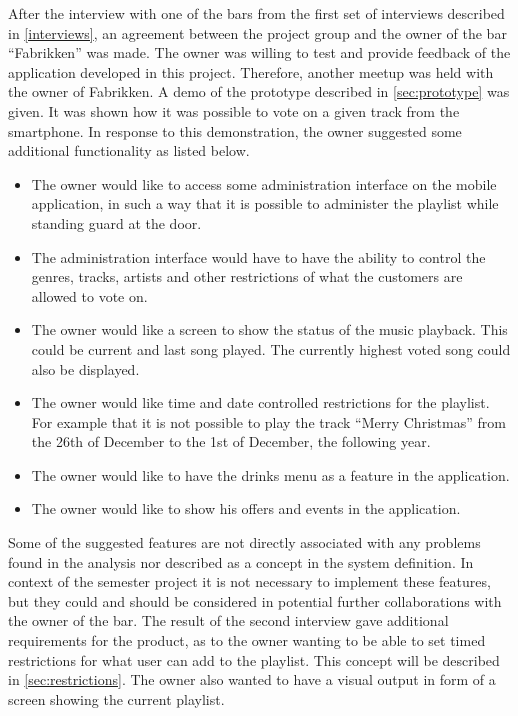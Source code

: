 \label{sec:fabrikken}
After the interview with one of the bars from the first set of interviews described in \cref{interviews}, an agreement between the project group and the owner of the bar \enquote{Fabrikken} was made. The owner was willing to test and provide feedback of the application developed in this project. Therefore, another meetup was held with the owner of Fabrikken. A demo of the prototype described in \cref{sec:prototype} was given. It was shown how it was possible to vote on a given track from the smartphone. In response to this demonstration, the owner suggested some additional functionality as listed below.

\begin{itemize}
    \item{The owner would like to access some administration interface on the mobile application, in such a way that it is possible to administer the playlist while standing guard at the door.}
    \item{The administration interface would have to have the ability to control the genres, tracks, artists and other restrictions of what the customers are allowed to vote on.}
    \item{The owner would like a screen to show the status of the music playback. This could be current and last song played. The currently highest voted song could also be displayed.}
    \item{The owner would like time and date controlled restrictions for the playlist. For example that it is not possible to play the track \enquote{Merry Christmas} from the 26th of December to the 1st of December, the following year.}
    \item{The owner would like to have the drinks menu as a feature in the application.}
    \item{The owner would like to show his offers and events in the application.}
\end{itemize}

Some of the suggested features are not directly associated with any
problems found in the analysis nor described as a concept in the
system definition. In context of the semester project it is not
necessary to implement these features, but they could and should be
considered in potential further collaborations with the owner of the
bar. The result of the second interview gave additional requirements
for the product, as to the owner wanting to be able to set timed
restrictions for what user can add to the playlist. This concept will
be described in \cref{sec:restrictions}. The owner also wanted to have
a visual output in form of a screen showing the current playlist.
